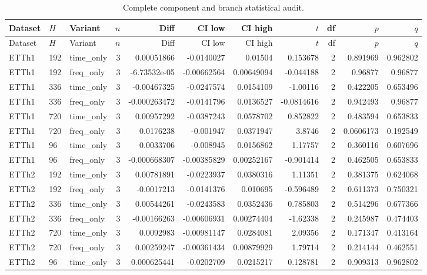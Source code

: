 \begin{longtable}{lllrrrrrrrr}
\caption{Complete component and branch statistical audit.}\\
\toprule
Dataset & $H$ & Variant & $n$ & Diff & CI low & CI high & $t$ & df & $p$ & $q$ \\
\midrule
\endfirsthead
\toprule
Dataset & $H$ & Variant & $n$ & Diff & CI low & CI high & $t$ & df & $p$ & $q$ \\
\midrule
\endhead
ETTh1 & 192 & time\_only & 3 & 0.00051866 & -0.0140027 & 0.01504 & 0.153678 & 2 & 0.891969 & 0.962802 \\
ETTh1 & 192 & freq\_only & 3 & -6.73532e-05 & -0.00662564 & 0.00649094 & -0.044188 & 2 & 0.96877 & 0.96877 \\
ETTh1 & 336 & time\_only & 3 & -0.00467325 & -0.0247574 & 0.0154109 & -1.00116 & 2 & 0.422205 & 0.653496 \\
ETTh1 & 336 & freq\_only & 3 & -0.000263472 & -0.0141796 & 0.0136527 & -0.0814616 & 2 & 0.942493 & 0.96877 \\
ETTh1 & 720 & time\_only & 3 & 0.00957292 & -0.0387243 & 0.0578702 & 0.852822 & 2 & 0.483594 & 0.653833 \\
ETTh1 & 720 & freq\_only & 3 & 0.0176238 & -0.001947 & 0.0371947 & 3.8746 & 2 & 0.0606173 & 0.192549 \\
ETTh1 & 96 & time\_only & 3 & 0.0033706 & -0.008945 & 0.0156862 & 1.17757 & 2 & 0.360116 & 0.607696 \\
ETTh1 & 96 & freq\_only & 3 & -0.000668307 & -0.00385829 & 0.00252167 & -0.901414 & 2 & 0.462505 & 0.653833 \\
ETTh2 & 192 & time\_only & 3 & 0.00781891 & -0.0223937 & 0.0380316 & 1.11351 & 2 & 0.381375 & 0.624068 \\
ETTh2 & 192 & freq\_only & 3 & -0.0017213 & -0.0141376 & 0.010695 & -0.596489 & 2 & 0.611373 & 0.750321 \\
ETTh2 & 336 & time\_only & 3 & 0.00544261 & -0.0243583 & 0.0352436 & 0.785803 & 2 & 0.514296 & 0.677366 \\
ETTh2 & 336 & freq\_only & 3 & -0.00166263 & -0.00606931 & 0.00274404 & -1.62338 & 2 & 0.245987 & 0.474403 \\
ETTh2 & 720 & time\_only & 3 & 0.0092983 & -0.00981147 & 0.0284081 & 2.09356 & 2 & 0.171347 & 0.413164 \\
ETTh2 & 720 & freq\_only & 3 & 0.00259247 & -0.00361434 & 0.00879929 & 1.79714 & 2 & 0.214144 & 0.462551 \\
ETTh2 & 96 & time\_only & 3 & 0.000625441 & -0.0202709 & 0.0215217 & 0.128781 & 2 & 0.909313 & 0.962802 \\

\end{longtable}
